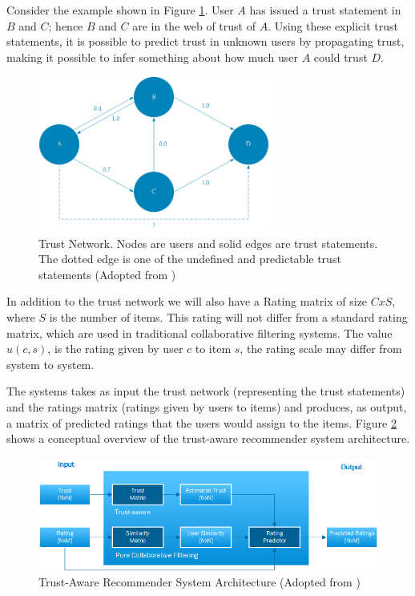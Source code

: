 Consider the example shown in Figure \ref{figure:weboftrust}. User $A$ has issued a trust statement in $B$ and $C$; hence
$B$ and $C$ are in the web of trust of $A$. Using these explicit trust statements, it
is possible to predict trust in unknown users by propagating trust, making it
possible to infer something about how much user $A$ could trust $D$.

\begin{figure}[H]
    \includegraphics[width=3in]{image/webofTrust.png}
    \centering
    \caption[Trust Network]{Trust Network. Nodes are users and solid edges are trust statements. The dotted edge is one of the undefined and predictable trust statements (Adopted from \cite{Massa2004})}
    \label{figure:weboftrust}
\end{figure}

In addition to the trust network we will also have a Rating matrix of size $CxS$, where $S$ is
the number of items. This rating will not differ from a standard rating matrix,
which are used in traditional collaborative filtering systems. The value $u(c,s)$, is the rating given by user $c$ to item $s$, the rating scale may differ from system to system.

The systems takes as input the trust network (representing the trust
statements) and the ratings matrix (ratings given by users to items) and
produces, as output, a matrix of predicted ratings that the users would assign
to the items. Figure \ref{figure:trustarchictecture} shows a conceptual
overview of the trust-aware recommender system architecture.

\begin{figure}[H]
    \includegraphics[width=5in]{image/trustawarearchitecture.png}
    \centering
    \caption[Trust-Aware Recommender System Architecture]{Trust-Aware
    Recommender System Architecture (Adopted from \cite{Massa2004})}
    \label{figure:trustarchictecture}
\end{figure}


